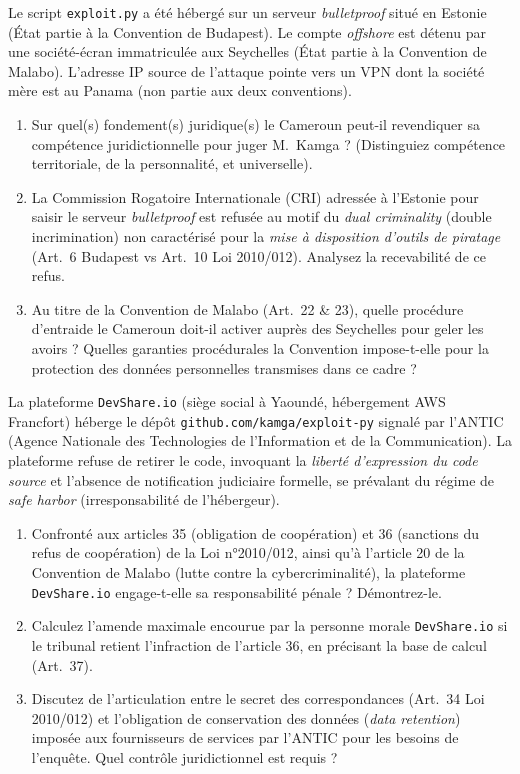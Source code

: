 \documentclass[11pt]{article}
\begin{document}
\begin{exercice}
Le script \texttt{exploit.py} a été hébergé sur un serveur \textit{bulletproof} situé en Estonie (État partie à la Convention de Budapest). Le compte \textit{offshore} est détenu par une société-écran immatriculée aux Seychelles (État partie à la Convention de Malabo). L'adresse IP source de l'attaque pointe vers un VPN dont la société mère est au Panama (non partie aux deux conventions).
\begin{enumerate}
    \item Sur quel(s) fondement(s) juridique(s) le Cameroun peut-il revendiquer sa compétence juridictionnelle pour juger M.~Kamga ? (Distinguiez compétence territoriale, de la personnalité, et universelle).
    \item La Commission Rogatoire Internationale (CRI) adressée à l'Estonie pour saisir le serveur \textit{bulletproof} est refusée au motif du \textit{dual criminality} (double incrimination) non caractérisé pour la \textit{mise à disposition d'outils de piratage} (Art.~6 Budapest vs Art.~10 Loi 2010/012). Analysez la recevabilité de ce refus.
    \item Au titre de la Convention de Malabo (Art.~22 \& 23), quelle procédure d'entraide le Cameroun doit-il activer auprès des Seychelles pour geler les avoirs ? Quelles garanties procédurales la Convention impose-t-elle pour la protection des données personnelles transmises dans ce cadre ?
\end{enumerate}
\end{exercice}

\begin{exercice}
La plateforme \texttt{DevShare.io} (siège social à Yaoundé, hébergement AWS Francfort) héberge le dépôt \texttt{github.com/kamga/exploit-py} signalé par l'ANTIC (Agence Nationale des Technologies de l'Information et de la Communication). La plateforme refuse de retirer le code, invoquant la \textit{liberté d'expression du code source} et l'absence de notification judiciaire formelle, se prévalant du régime de \textit{safe harbor} (irresponsabilité de l'hébergeur).
\begin{enumerate}
    \item Confronté aux articles 35 (obligation de coopération) et 36 (sanctions du refus de coopération) de la Loi n°2010/012, ainsi qu'à l'article 20 de la Convention de Malabo (lutte contre la cybercriminalité), la plateforme \texttt{DevShare.io} engage-t-elle sa responsabilité pénale ? Démontrez-le.
    \item Calculez l'amende maximale encourue par la personne morale \texttt{DevShare.io} si le tribunal retient l'infraction de l'article 36, en précisant la base de calcul (Art.~37).
    \item Discutez de l'articulation entre le secret des correspondances (Art.~34 Loi 2010/012) et l'obligation de conservation des données (\textit{data retention}) imposée aux fournisseurs de services par l'ANTIC pour les besoins de l'enquête. Quel contrôle juridictionnel est requis ?
\end{enumerate}
\end{exercice}
\end{document}
